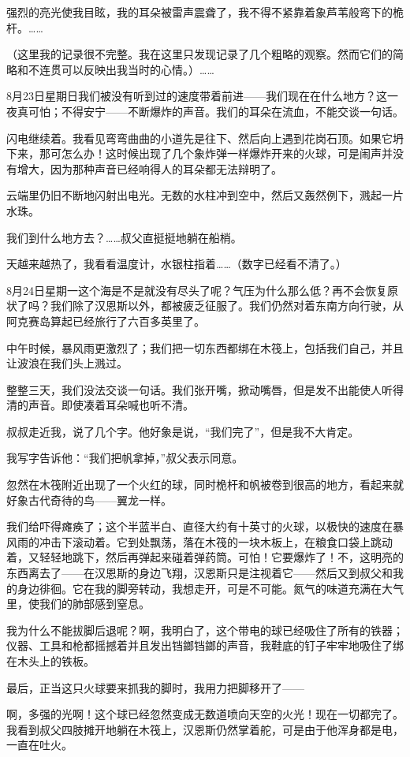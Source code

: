 \documentclass[10pt]{book}
\begin{document}
强烈的亮光使我目眩，我的耳朵被雷声震聋了，我不得不紧靠着象芦苇般弯下的桅杆。……

（这里我的记录很不完整。我在这里只发现记录了几个粗略的观察。然而它们的简略和不连贯可以反映出我当时的心情。）……

8月23日星期日我们被没有听到过的速度带着前进——我们现在在什么地方？这一夜真可怕；不得安宁——不断爆炸的声音。我们的耳朵在流血，不能交谈一句话。

闪电继续着。我看见弯弯曲曲的小道先是往下、然后向上遇到花岗石顶。如果它坍下来，那可怎么办！这时候出现了几个象炸弹一样爆炸开来的火球，可是闹声并没有增大，因为那种声音已经响得人的耳朵都无法辩明了。

云端里仍旧不断地闪射出电光。无数的水柱冲到空中，然后又轰然例下，溅起一片水珠。

我们到什么地方去？……叔父直挺挺地躺在船梢。

天越来越热了，我看看温度计，水银柱指着……（数字已经看不清了。）

8月24日星期一这个海是不是就没有尽头了呢？气压为什么那么低？再不会恢复原状了吗？我们除了汉恩斯以外，都被疲乏征服了。我们仍然对着东南方向行驶，从阿克赛岛算起已经旅行了六百多英里了。

中午时候，暴风雨更激烈了；我们把一切东西都绑在木筏上，包括我们自己，并且让波浪在我们头上溅过。

整整三天，我们没法交谈一句话。我们张开嘴，掀动嘴唇，但是发不出能使人听得清的声音。即使凑着耳朵喊也听不清。

叔叔走近我，说了几个字。他好象是说，“我们完了”，但是我不大肯定。

我写字告诉他：“我们把帆拿掉，”叔父表示同意。

忽然在木筏附近出现了一个火红的球，同时桅杆和帆被卷到很高的地方，看起来就好象古代奇待的鸟——翼龙一样。

我们给吓得瘫痪了；这个半蓝半白、直径大约有十英寸的火球，以极快的速度在暴风雨的冲击下滚动着。它到处飘荡，落在木筏的一块木板上，在粮食口袋上跳动着，又轻轻地跳下，然后再弹起来碰着弹药筒。可怕！它要爆炸了！不，这明亮的东西离去了——在汉恩斯的身边飞翔，汉恩斯只是注视着它——然后又到叔父和我的身边徘徊。它在我的脚旁转动，我想走开，可是不可能。氮气的味道充满在大气里，使我们的肺部感到窒息。

我为什么不能拔脚后退呢？啊，我明白了，这个带电的球已经吸住了所有的铁器；仪器、工具和枪都摇撼着并且发出铛鎯铛鎯的声音，我鞋底的钉子牢牢地吸住了绑在木头上的铁板。

最后，正当这只火球要来抓我的脚时，我用力把脚移开了——

啊，多强的光啊！这个球已经忽然变成无数道喷向天空的火光！现在一切都完了。我看到叔父四肢摊开地躺在木筏上，汉恩斯仍然掌着舵，可是由于他浑身都是电，一直在吐火。
\end{document}
